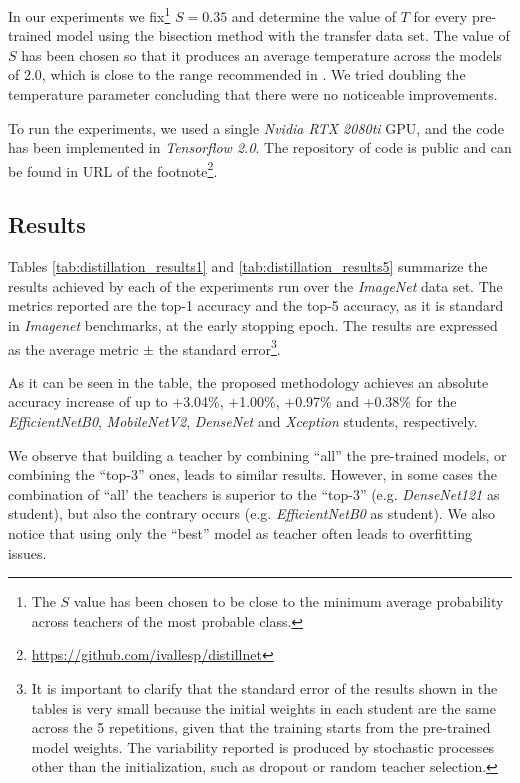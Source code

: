 In our experiments we fix\footnote{The $S$ value has been chosen to be close to the minimum average probability across teachers of the most probable class.} $S=0.35$ and determine the value of $T$ for every pre-trained model using the bisection method with the transfer data set. The value of $S$ has been chosen so that it produces an average temperature across the models of 2.0, which is close to the range recommended in \autocite{hinton2015}. We tried doubling the temperature parameter concluding that there were no noticeable improvements.

To run the experiments, we used a single \textit{Nvidia RTX 2080ti} GPU, and the code has been implemented in \textit{Tensorflow 2.0}. The repository of code is public and can be found in URL of the footnote\footnote{\url{https://github.com/ivallesp/distillnet}}.

\subsection{Results}  \label{sec:distillation_results}
Tables \ref{tab:distillation_results1} and \ref{tab:distillation_results5} summarize the results achieved by each of the experiments run over the \textit{ImageNet} data set. The metrics reported are the top-1 accuracy and the top-5 accuracy, as it is standard in \textit{Imagenet} benchmarks, at the early stopping epoch. The results are expressed as the average metric $\pm$ the standard error\footnote{It is important to clarify that the standard error of the results shown in the tables is very small because the initial weights in each student are the same across the 5 repetitions, given that the training starts from the pre-trained model weights. The variability reported is produced by stochastic processes other than the initialization, such as dropout or random teacher selection.}.

As it can be seen in the table, the proposed methodology achieves an absolute accuracy increase of up to +3.04\%, +1.00\%, +0.97\% and +0.38\% for the \textit{EfficientNetB0}, \textit{MobileNetV2},  \textit{DenseNet} and \textit{Xception} students, respectively.

We observe that building a teacher by combining ``all'' the pre-trained models, or combining the ``top-3'' ones, leads to similar results. However, in some cases the combination of ``all' the teachers is superior to the ``top-3'' (e.g. \textit{DenseNet121} as student), but also the contrary occurs (e.g. \textit{EfficientNetB0} as student). We also notice that using only the ``best'' model as teacher often leads to overfitting issues.

